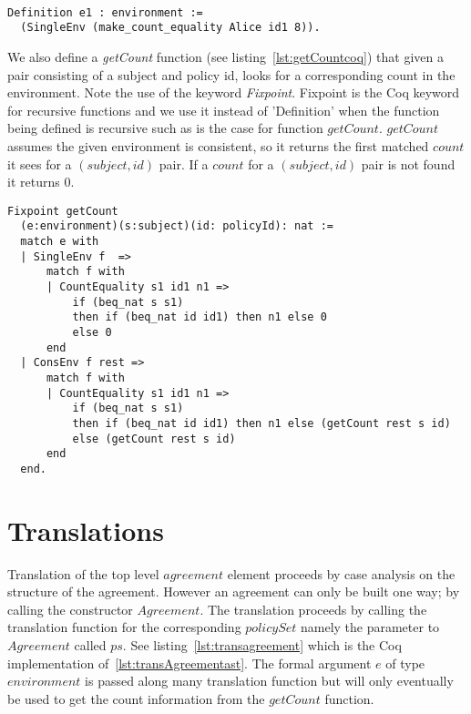\begin{minipage}[c]{0.95\textwidth}
\begin{lstlisting}

Definition e1 : environment := 
  (SingleEnv (make_count_equality Alice id1 8)).

\end{lstlisting}
\end{minipage}
  

We also define a \emph{getCount} function (see listing~\ref{lst:getCountcoq}) that given a pair consisting of a subject and policy id, looks for a corresponding count in the environment. Note the use of the keyword \emph{Fixpoint}. Fixpoint is the Coq keyword for recursive functions and we use it instead of 'Definition' when the function being defined is recursive such as is the case for function $getCount$. $getCount$ assumes the given environment is consistent, so it returns the first matched $count$ it sees for a $(subject, id)$ pair. If a $count$ for a $(subject, id)$ pair is not found it returns 0. 


\begin{minipage}[c]{0.95\textwidth}
\begin{lstlisting}
Fixpoint getCount 
  (e:environment)(s:subject)(id: policyId): nat :=
  match e with
  | SingleEnv f  => 
      match f with 
	  | CountEquality s1 id1 n1 => 
          if (beq_nat s s1) 
          then if (beq_nat id id1) then n1 else 0 
          else 0  
      end			
  | ConsEnv f rest =>
      match f with 
	  | CountEquality s1 id1 n1 => 
          if (beq_nat s s1)
          then if (beq_nat id id1) then n1 else (getCount rest s id)  
          else (getCount rest s id)
      end
  end.
\end{lstlisting}
\end{minipage}

\section{Translations}

Translation of the top level $agreement$ element proceeds by case analysis on the structure of the agreement. However an agreement can only be built one way; by calling the constructor $Agreement$. The translation proceeds by calling the translation function for the corresponding $policySet$ namely the parameter to $Agreement$ called $ps$. See listing~\ref{lst:transagreement} which is the Coq implementation of~\ref{lst:transAgreementast}. The formal argument $e$ of type $environment$ is passed along many translation function but will only eventually be used to get the count information from the $getCount$ function.


